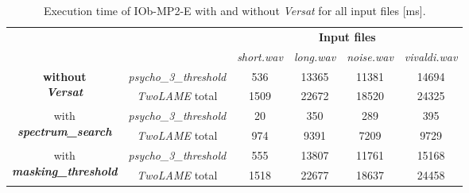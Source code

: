 \begin{table}[H]
    \centering
    \begin{tabular}{|c|c|c|c|c|c|}
    \cline{3-6}
    \multicolumn{2}{c|}{}  & \multicolumn{4}{c|}{\textbf{Input files}} \\
    \cline{3-6}
    \multicolumn{2}{c|}{} & \textit{short.wav} & \textit{long.wav} & \textit{noise.wav} & \textit{vivaldi.wav} \\
    \hline
   \multirow{2}{*}{\parbox{2.5cm}{\centering \textbf{without} \\ \textbf{\textit{Versat}}}}  & \multicolumn{1}{c|}{\textit{psycho\_3\_threshold}}  & 536 & 13365 & 11381 & 14694 \\ 
    \cline{2-6}
    & \multicolumn{1}{|c|}{\textit{TwoLAME} total}  & 1509 & 22672 & 18520 & 24325\\ 
    \hline
    \multirow{2}{*}{\parbox{3.2cm}{\centering with \\ \textbf{\textit{spectrum\_search}}}}  & \multicolumn{1}{c|}{\textit{psycho\_3\_threshold}}  & 20 & 350 & 289 & 395 \\ 
    \cline{2-6}
    & \multicolumn{1}{|c|}{\textit{TwoLAME} total}  & 974 & 9391 & 7209 & 9729 \\ 
    \hline
    \multirow{2}{*}{\parbox{3.2cm}{\centering with \\ \textbf{\textit{masking\_threshold}}}}  & \multicolumn{1}{c|}{\textit{psycho\_3\_threshold}}  & 555 & 13807 & 11761 & 15168 \\ 
    \cline{2-6}
    & \multicolumn{1}{|c|}{\textit{TwoLAME} total}  & 1518 & 22677 & 18637 & 24458 \\ 
    \hline
    \end{tabular}
    \caption{Execution time of IOb-MP2-E with and without \textit{Versat} for all input files [ms].}
    \label{time}
\end{table}


\vspace{0.5cm}

